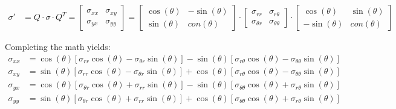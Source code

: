 \begin{align}
	\sigma' &= Q \cdot \sigma \cdot Q^{T} =
	\begin{bmatrix}
		\sigma_{xx} & \sigma_{xy}\\
		\sigma_{yx} & \sigma_{yy}
	\end{bmatrix}=
	\begin{bmatrix}
		\cos(\theta) & -\sin(\theta)\\
		\sin(\theta) & con(\theta)	
	\end{bmatrix}\cdot
	\begin{bmatrix}
		\sigma_{rr} & \sigma_{r\theta}\\
		\sigma_{\theta r} & \sigma_{\theta \theta}
	\end{bmatrix}
\cdot
	\begin{bmatrix}
		\cos(\theta) & \sin(\theta)\\
		-\sin(\theta) & con(\theta)	
	\end{bmatrix}
\end{align}

Completing the math yields:
\begin{align}
	\sigma_{xx} &= \cos(\theta) \left[\sigma_{rr} \cos(\theta) - \sigma_{\theta r} \sin(
\theta)\right] - \sin(\theta)\left[\sigma_{r\theta}\cos(\theta) - \sigma_{\theta\theta}\sin(\theta)\right]\\
	\sigma_{xy} &= \sin(\theta) \left[\sigma_{rr} \cos(\theta) - \sigma_{\theta r} \sin(
\theta)\right] + \cos(\theta)\left[\sigma_{r\theta}\cos(\theta) - \sigma_{\theta\theta}\sin(\theta)\right]\\
	\sigma_{yx} &= \cos(\theta) \left[\sigma_{\theta r} \cos(\theta) + \sigma_{rr} \sin(
\theta)\right] - \sin(\theta)\left[\sigma_{\theta \theta}\cos(\theta) + \sigma_{r\theta}\sin(\theta)\right]\\
	\sigma_{yy} &= \sin(\theta) \left[\sigma_{\theta r} \cos(\theta) + \sigma_{rr} \sin(
\theta)\right] + \cos(\theta)\left[\sigma_{\theta \theta}\cos(\theta) + \sigma_{r\theta}\sin(\theta)\right]
\end{align}

